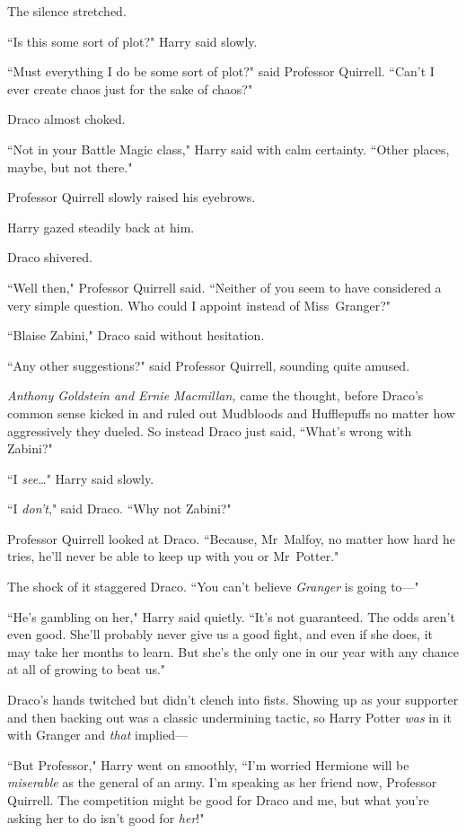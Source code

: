 The silence stretched.

``Is this some sort of plot?" Harry said slowly.

``Must everything I do be some sort of plot?" said Professor Quirrell. ``Can't I ever create chaos just for the sake of chaos?"

Draco almost choked.

``Not in your Battle Magic class," Harry said with calm certainty. ``Other places, maybe, but not there."

Professor Quirrell slowly raised his eyebrows.

Harry gazed steadily back at him.

Draco shivered.

``Well then," Professor Quirrell said. ``Neither of you seem to have considered a very simple question. Who could I appoint instead of Miss~Granger?"

``Blaise Zabini," Draco said without hesitation.

``Any other suggestions?" said Professor Quirrell, sounding quite amused.

\emph{Anthony Goldstein and Ernie Macmillan,} came the thought, before Draco's common sense kicked in and ruled out Mudbloods and Hufflepuffs no matter how aggressively they dueled. So instead Draco just said, ``What's wrong with Zabini?"

``I \emph{see}{\ldots}" Harry said slowly.

``I \emph{don't}," said Draco. ``Why not Zabini?"

Professor Quirrell looked at Draco. ``Because, Mr~Malfoy, no matter how hard he tries, he'll never be able to keep up with you or Mr~Potter."

The shock of it staggered Draco. ``You can't believe \emph{Granger} is going to—"

``He's gambling on her," Harry said quietly. ``It's not guaranteed. The odds aren't even good. She'll probably never give us a good fight, and even if she does, it may take her months to learn. But she's the only one in our year with any chance at all of growing to beat us."

Draco's hands twitched but didn't clench into fists. Showing up as your supporter and then backing out was a classic undermining tactic, so Harry Potter \emph{was} in it with Granger and \emph{that} implied—

``But Professor," Harry went on smoothly, ``I'm worried Hermione will be \emph{miserable} as the general of an army. I'm speaking as her friend now, Professor Quirrell. The competition might be good for Draco and me, but what you're asking her to do isn't good for \emph{her}!"


